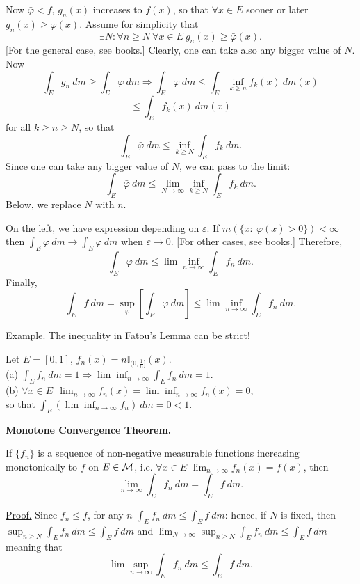 \documentclass[a4paper,10pt]{article}
\def\II{\mathbb{I}}
\newcommand{\1}[1]{\mathbf{1}_{\{#1\}}}
\begin{document}
Now $\bar\varphi<f$, $g_n(x)$ increases to $f(x)$, so that $\forall x\in E$ sooner or later $g_n(x)\ge\bar\varphi(x)$. Assume for simplicity that
  $$\exists N: \forall n\ge N~\forall x\in E~ g_n(x)\ge\bar\varphi(x).$$
[For the general case, see books.] Clearly, one can take also any bigger value of $N$.
Now
  $$\int_E g_n~dm\ge\int_E\bar\varphi~dm\Longrightarrow \int_E\bar\varphi~dm\le \int_E \inf_{k\ge n} f_k(x)~dm(x)$$
  $$\le \int_E f_k(x) ~dm(x)$$
for all $k\ge n\ge N$, so that
  $$\int_E\bar\varphi~dm\le\inf_{k\ge N} \int_E f_k~dm.$$
Since one can take any bigger value of $N$, we  can pass to the limit:
  $$\int_E\bar\varphi~dm\le\lim_{N\to\infty} \inf_{k\ge N} \int_E f_k~dm.$$
Below, we replace $N$ with $n$.

On the left, we have expression depending on $\varepsilon$. If $m(\{x:~\varphi(x)>0\})<\infty$ then $\int_E\bar\varphi~dm\to \int_E\varphi~dm$ when $\varepsilon\to 0$.
[For other cases, see books.] Therefore,
  $$\int_E\varphi~dm\le \lim \inf_{n\to\infty} \int_E f_n~dm.$$
Finally,
  $$\int_E f~dm=\sup_\varphi \left[\int_E \varphi~dm\right]\le \lim \inf_{n\to\infty}\int_E f_n~dm.$$
\blacksquare \vspace{3mm}

\underline{Example.} The inequality in Fatou's Lemma can be strict!

Let $E=[0,1]$, $f_n(x)=n\II_{(0,\frac{1}{n}]}(x)$.\\
(a) $\displaystyle\int_E f_n~dm=1\Longrightarrow \lim \inf_{n\to\infty} \int_E f_n~dm=1$.\\
(b) $\displaystyle \forall x\in E~~\lim_{n\to\infty} f_n(x)=\lim \inf_{n\to\infty} f_n(x)=0$,\\ so that $\displaystyle \int_E\left(\lim \inf_{n\to\infty} f_n\right) ~dm=0<1$.
\vspace{3mm}

{\bf Monotone Convergence Theorem.}\vspace{3mm}

If $\{f_n\}$ is a sequence of non-negative measurable functions increasing monotonically to $f$ on $E\in{\cal M}$, i.e. $\forall x\in E$ $\lim_{n\to\infty} f_n(x)=f(x)$, then
  $$\lim_{n\to\infty} \int_E f_n~ dm=\int_E f~dm.$$
\vspace{3mm}

\underline{Proof.} Since $f_n\le f$, for any $n$ $\int_E f_n~dm\le \int_E f~dm$: hence, if $N$ is fixed, then $\sup_{n\ge N} \int_E f_n~dm\le \int_E f~dm$ and $\lim_{N\to\infty} \sup_{n\ge N} \int_E f_n~dm \le \int_E f~dm$ meaning that
  $$\lim \sup_{n\to\infty} \int_E f_n~dm \le \int_E f~dm.$$
\end{document}
